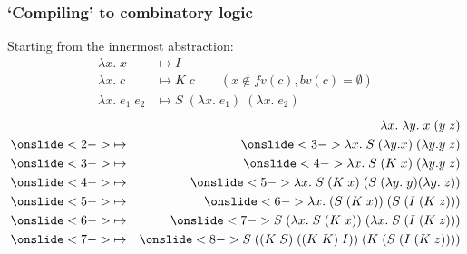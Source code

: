 \documentclass[aspectratio=1610, xcolor={dvipsnames}]{beamer}
\begin{document}
\begin{frame}
    \frametitle{`Compiling' to combinatory logic}

    Starting from the innermost abstraction:
    \begin{align*}
        \lambda x.\; x & \mapsto I \\
        \lambda x.\; c & \mapsto K \;c \qquad (x \not \in fv(c), bv(c) = \emptyset) \\
        \lambda x.\; e_1\; e_2 & \mapsto S \; (\lambda x.\; e_1) \;(\lambda x.\; e_2)
    \end{align*}
    \pause
    \begin{align*}
        &&\lambda x.\; \lambda y.\; x \;(y \;z) \\
        &\onslide<2->{\mapsto} &  \onslide<3->{\lambda x.\; S \;(\lambda y. x) \;(\lambda y. y \;z)}\\
        &\onslide<3->{\mapsto} &  \onslide<4->{\lambda x.\; S \;(K \;x) \;(\lambda y. y \;z)}\\
        &\onslide<4->{\mapsto} &  \onslide<5->{\lambda x.\; S \;(K \;x) \;(S \; (\lambda y. \; y) (\lambda y. \; z))}\\
        &\onslide<5->{\mapsto} &  \onslide<6->{\lambda x.\; (S \;(K \;x)) \;(S \; (I \;(K \;z)))}\\
        &\onslide<6->{\mapsto} &  \onslide<7->{S\; (\lambda x. \;S \;(K \;x)) \;(\lambda x.\; S \; (I \;(K \;z)))}\\
        &\onslide<7->{\mapsto} &  \onslide<8->{S\; ((K\; S) \;((K\; K) \;I)) \;(K \; (S \; (I \;(K \;z))))}\\
    \end{align*}
\end{frame}
\end{document}
